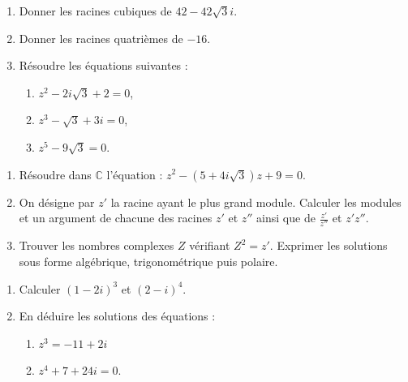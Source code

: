 %
\begin{exo}
	\begin{enumerate}
		\item Donner les racines cubiques de $42 - 42 \sqrt{3} i$.
		\item Donner les racines quatri\`emes de $- 16$.
		\item R\'esoudre les \'equations suivantes : 
			\begin{enumerate}
				\item $z^2 - 2 i \sqrt{3} + 2 = 0$,
				\item $z^3 - \sqrt{3} + 3i = 0$,
				\item $z^5 - 9 \sqrt{3} = 0$.
			\end{enumerate}
	\end{enumerate}
\end{exo}
\begin{exo}
      \begin{enumerate}
            \item R\'esoudre dans $\mathbb{C}$ l'\'equation : $z^2 - (5+4i\sqrt{3}) z + 9 = 0$.
            \item On d\'esigne par $z'$ la racine ayant le plus grand module.
                  Calculer les modules et un argument de chacune des racines $z'$ et $z''$ 
                  ainsi que de $\frac{z'}{z''}$ et $z' z''$.
            \item Trouver les nombres complexes $Z$ v\'erifiant $Z^2 = z'$.
                  Exprimer les solutions sous forme alg\'ebrique, trigonom\'etrique puis polaire.
      \end{enumerate}
\end{exo}
%
\begin{exo}
      \begin{enumerate}
            \item Calculer $(1-2i)^3$ et $(2-i)^4$.
            \item En d\'eduire les solutions des \'equations : 
                  \begin{enumerate}
                        \item $z^3 = - 11 + 2i$
                        \item $z^4 + 7 + 24 i = 0$.
                  \end{enumerate}
      \end{enumerate}
\end{exo}
